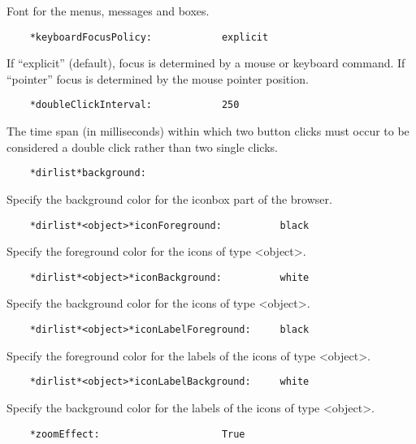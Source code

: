    Font for the menus, messages and boxes.

\begin{verbatim}
    *keyboardFocusPolicy:            explicit
\end{verbatim}

   If ``explicit'' (default), focus is determined by a mouse or keyboard
   command. If ``pointer'' focus is determined by the mouse pointer position.

\begin{verbatim}
    *doubleClickInterval:            250
\end{verbatim}

   The time span (in milliseconds) within which two button clicks must occur
   to be considered a double click rather than two single clicks.

\begin{verbatim}
    *dirlist*background:
\end{verbatim}

   Specify the background color for the iconbox part of the browser.

\begin{verbatim}
    *dirlist*<object>*iconForeground:          black
\end{verbatim}

   Specify the foreground color for the icons of type <object>.

\begin{verbatim}
    *dirlist*<object>*iconBackground:          white
\end{verbatim}

   Specify the background color for the icons of type <object>.

\begin{verbatim}
    *dirlist*<object>*iconLabelForeground:     black
\end{verbatim}

   Specify the foreground color for the labels of the icons of type <object>.

\begin{verbatim}
    *dirlist*<object>*iconLabelBackground:     white
\end{verbatim}

   Specify the background color for the labels of the icons of type <object>.

\begin{verbatim}
    *zoomEffect:                     True
\end{verbatim}

